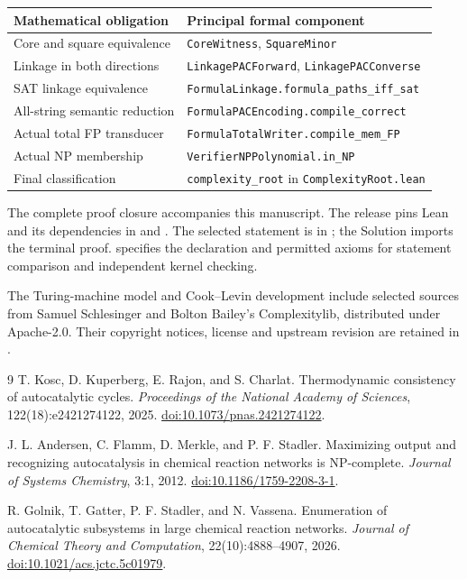 \documentclass[11pt,a4paper]{article}
\begin{document}
\begin{center}
\small
\begin{tabular}{@{}p{.35\linewidth}p{.59\linewidth}@{}}
\toprule
Mathematical obligation & Principal formal component\\
\midrule
Core and square equivalence & \texttt{CoreWitness}, \texttt{SquareMinor}\\
Linkage in both directions & \texttt{LinkagePACForward}, \texttt{LinkagePACConverse}\\
SAT linkage equivalence & \texttt{FormulaLinkage.formula\_paths\_iff\_sat}\\
All-string semantic reduction & \texttt{FormulaPACEncoding.compile\_correct}\\
Actual total FP transducer & \texttt{FormulaTotalWriter.compile\_mem\_FP}\\
Actual NP membership & \texttt{VerifierNPPolynomial.in\_NP}\\
Final classification & \texttt{complexity\_root} in \texttt{ComplexityRoot.lean}\\
\bottomrule
\end{tabular}
\end{center}

The complete proof closure accompanies this manuscript. The release pins
Lean and its dependencies in  and
. The selected statement is in
; the Solution imports the terminal proof.
 specifies the declaration and permitted
axioms for statement comparison and independent kernel checking.

The Turing-machine model and Cook--Levin development include selected
sources from Samuel Schlesinger and Bolton Bailey's Complexitylib, distributed
under Apache-2.0. Their copyright notices, license and upstream revision are
retained in .

\begin{thebibliography}{9}
T. Kosc, D. Kuperberg, E. Rajon, and S. Charlat.
Thermodynamic consistency of autocatalytic cycles.
\emph{Proceedings of the National Academy of Sciences},
122(18):e2421274122, 2025.
\href{https://doi.org/10.1073/pnas.2421274122}{doi:10.1073/pnas.2421274122}.

J. L. Andersen, C. Flamm, D. Merkle, and P. F. Stadler.
Maximizing output and recognizing autocatalysis in chemical reaction
networks is NP-complete.
\emph{Journal of Systems Chemistry}, 3:1, 2012.
\href{https://doi.org/10.1186/1759-2208-3-1}{doi:10.1186/1759-2208-3-1}.

R. Golnik, T. Gatter, P. F. Stadler, and N. Vassena.
Enumeration of autocatalytic subsystems in large chemical reaction networks.
\emph{Journal of Chemical Theory and Computation}, 22(10):4888--4907, 2026.
\href{https://doi.org/10.1021/acs.jctc.5c01979}{doi:10.1021/acs.jctc.5c01979}.
\end{thebibliography}
\end{document}
